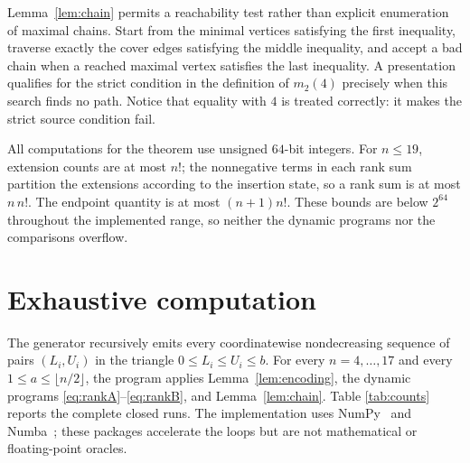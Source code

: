 \documentclass[11pt]{article}
\theoremstyle{definition}
\begin{document}
Lemma~\ref{lem:chain} permits a reachability test rather than explicit
enumeration of maximal chains.  Start from the minimal vertices satisfying
the first inequality, traverse exactly the cover edges satisfying the middle
inequality, and accept a bad chain when a reached maximal vertex satisfies the
last inequality.  A presentation qualifies for the strict condition in the
definition of $m_2(4)$ precisely when this search finds no path.  Notice that
equality with $4$ is treated correctly: it makes the strict source condition
fail.

All computations for the theorem use unsigned $64$-bit integers.  For
$n\leq19$, extension counts are at most $n!$; the nonnegative terms in each
rank sum partition the extensions according to the insertion state, so a
rank sum is at most $n\,n!$.  The endpoint quantity is at most
$(n+1)n!$.  These bounds are below $2^{64}$ throughout the implemented range,
so neither the dynamic programs nor the comparisons overflow.

\section{Exhaustive computation}

The generator recursively emits every coordinatewise nondecreasing sequence
of pairs $(L_i,U_i)$ in the triangle $0\leq L_i\leq U_i\leq b$.  For every
$n=4,\ldots,17$ and every $1\leq a\leq\lfloor n/2\rfloor$, the program
applies Lemma~\ref{lem:encoding}, the dynamic programs
\eqref{eq:rankA}--\eqref{eq:rankB}, and Lemma~\ref{lem:chain}.  Table
\ref{tab:counts} reports the complete closed runs.  The implementation uses
NumPy~\cite{harris2020numpy} and Numba~\cite{lam2015numba}; these packages
accelerate the loops but are not mathematical or floating-point oracles.
\end{document}
